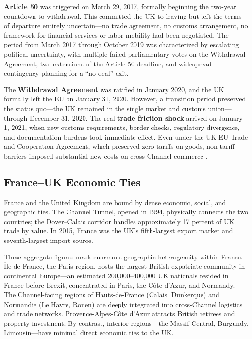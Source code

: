 \documentclass[12pt]{article}
\begin{document}
\textbf{Article 50} was triggered on March 29, 2017, formally beginning the two-year countdown to withdrawal. This committed the UK to leaving but left the terms of departure entirely uncertain---no trade agreement, no customs arrangement, no framework for financial services or labor mobility had been negotiated. The period from March 2017 through October 2019 was characterized by escalating political uncertainty, with multiple failed parliamentary votes on the Withdrawal Agreement, two extensions of the Article 50 deadline, and widespread contingency planning for a ``no-deal'' exit.

The \textbf{Withdrawal Agreement} was ratified in January 2020, and the UK formally left the EU on January 31, 2020. However, a transition period preserved the status quo---the UK remained in the single market and customs union---through December 31, 2020. The real \textbf{trade friction shock} arrived on January 1, 2021, when new customs requirements, border checks, regulatory divergence, and documentation burdens took immediate effect. Even under the UK-EU Trade and Cooperation Agreement, which preserved zero tariffs on goods, non-tariff barriers imposed substantial new costs on cross-Channel commerce \citep{breinlich2022costs}.

\subsection{France--UK Economic Ties}

France and the United Kingdom are bound by dense economic, social, and geographic ties. The Channel Tunnel, opened in 1994, physically connects the two countries; the Dover--Calais corridor handles approximately 17 percent of UK trade by value. In 2015, France was the UK's fifth-largest export market and seventh-largest import source.

These aggregate figures mask enormous geographic heterogeneity within France. \^Ile-de-France, the Paris region, hosts the largest British expatriate community in continental Europe---an estimated 200,000--400,000 UK nationals resided in France before Brexit, concentrated in Paris, the C\^ote d'Azur, and Normandy. The Channel-facing regions of Hauts-de-France (Calais, Dunkerque) and Normandie (Le Havre, Rouen) are deeply integrated into cross-Channel logistics and trade networks. Provence-Alpes-C\^ote d'Azur attracts British retirees and property investment. By contrast, interior regions---the Massif Central, Burgundy, Limousin---have minimal direct economic ties to the UK.
\end{document}
